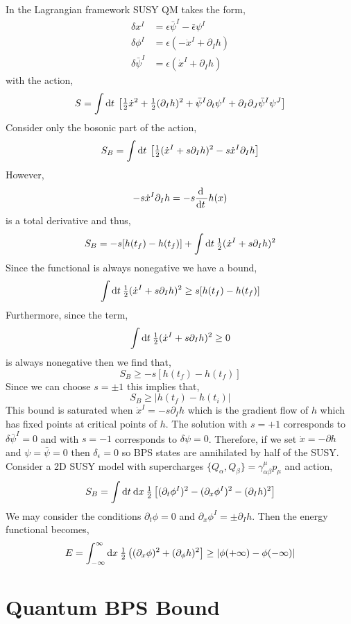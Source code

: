 \documentclass[12pt]{extarticle}
\begin{document}
In the Lagrangian framework SUSY QM takes the form,
\begin{align*}
\delta x^I & = \epsilon \bar{\psi}^I - \bar{\epsilon} \psi^I
\\
\delta \phi^I & = \epsilon (- \dot{x}^I + \partial_I h) 
\\
\delta \bar{\psi}^I & = \epsilon (\dot{x}^I + \partial_I h)
\end{align*}
with the action,
\[ S = \int \mathrm{d}t \: \left[ \tfrac{1}{2} \dot{x}^2 + \tfrac{1}{2} (\partial_I h)^2 + \bar{\psi}^I \partial_t \psi^I + \partial_I \partial_J \bar{\psi}^I \psi^J \right] \]
Consider only the bosonic part of the action,
\[ S_B = \int \mathrm{d}t \: \left[ \tfrac{1}{2} (\dot{x}^I + s \partial_I h)^2  - s \dot{x}^I \partial_I h \right] \]
However, 
\[ - s \dot{x}^I \partial_I h = - s \frac{\mathrm{d} \:}{\mathrm{d}t \:} h(x) \]
is a total derivative and thus,
\[ S_B = - s [h(t_f) - h(t_f)] + \int \mathrm{d}t \: \tfrac{1}{2} (\dot{x}^I + s \partial_I h)^2 \]
Since the functional is always nonegative we have a bound,
\[ \int \mathrm{d}t \: \tfrac{1}{2} (\dot{x}^I + s \partial_I h)^2 \ge s[h(t_f) - h(t_f)] \]
Furthermore, since the term,
\[ \int \mathrm{d}t \: \tfrac{1}{2} (\dot{x}^I + s \partial_I h)^2 \ge 0 \]
is always nonegative then we find that,
\[ S_B \ge - s [h(t_f) - h(t_f)]  \]
Since we can choose $s = \pm 1$ this implies that,
\[ S_B \ge |h(t_f) - h(t_i)| \]
This bound is saturated when $\dot{x}^I = - s \partial_I h$ which is the gradient flow of $h$ which has fixed points at critical points of $h$. The solution with $s = +1$ corresponds to $\delta \bar{\psi}^I = 0$ and with $s = -1$ corresponds to $\delta \psi = 0$. Therefore, if we set $\dot{x} = - \partial h$ and $\psi = \bar{\psi} = 0$ then $\delta_\epsilon = 0$ so BPS states are annihilated by half of the SUSY. 
\bigskip\\
Consider a 2D SUSY model with supercharges $\{ Q_\alpha, Q_\beta \} = \gamma^\mu_{\alpha \beta} p_\mu$ and action,
\[ S_B = \int \mathrm{d}t \: \mathrm{d}x \: \tfrac{1}{2} \left[ (\partial_t \phi^I)^2 - (\partial_x \phi^I)^2 - (\partial_I h)^2 \right] \]
We may consider the conditions $\partial_t \phi = 0$ and $\partial_x \phi^I = \pm \partial_I h$. Then the energy functional becomes,
\[ E = \int_{-\infty}^\infty \mathrm{d}x \: \tfrac{1}{2} \left( (\partial_x \phi)^2 + (\partial_\phi h)^2 \right] \ge | \phi(+ \infty) - \phi(-\infty) | \] 

\section{Quantum BPS Bound}
\end{document}
